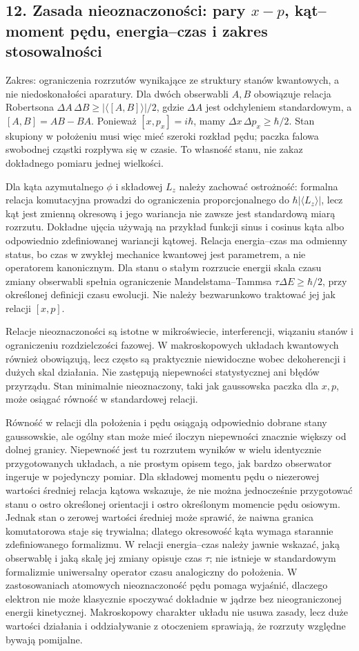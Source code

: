 \documentclass[11pt,a4paper]{article}
\begin{document}
\subsection{12. Zasada nieoznaczoności: pary \(x-p\), kąt--moment pędu, energia--czas i zakres stosowalności}
Zakres: ograniczenia rozrzutów wynikające ze struktury stanów kwantowych, a nie niedoskonałości aparatury. Dla dwóch obserwabli \(A,B\) obowiązuje relacja Robertsona \(\Delta A\,\Delta B\geq|\langle[A,B]\rangle|/2\), gdzie \(\Delta A\) jest odchyleniem standardowym, a \([A,B]=AB-BA\). Ponieważ \([x,p_x]=i\hbar\), mamy \(\Delta x\,\Delta p_x\geq\hbar/2\). Stan skupiony w położeniu musi więc mieć szeroki rozkład pędu; paczka falowa swobodnej cząstki rozpływa się w czasie. To własność stanu, nie zakaz dokładnego pomiaru jednej wielkości.

Dla kąta azymutalnego \(\phi\) i składowej \(L_z\) należy zachować ostrożność: formalna relacja komutacyjna prowadzi do ograniczenia proporcjonalnego do \(\hbar|\langle L_z\rangle|\), lecz kąt jest zmienną okresową i jego wariancja nie zawsze jest standardową miarą rozrzutu. Dokładne ujęcia używają na przykład funkcji sinus i cosinus kąta albo odpowiednio zdefiniowanej wariancji kątowej. Relacja energia--czas ma odmienny status, bo czas w zwykłej mechanice kwantowej jest parametrem, a nie operatorem kanonicznym. Dla stanu o stałym rozrzucie energii skala czasu zmiany obserwabli spełnia ograniczenie Mandelstama--Tammsa \(\tau\Delta E\geq\hbar/2\), przy określonej definicji czasu ewolucji. Nie należy bezwarunkowo traktować jej jak relacji \([x,p]\).

Relacje nieoznaczoności są istotne w mikroświecie, interferencji, wiązaniu stanów i ograniczeniu rozdzielczości fazowej. W makroskopowych układach kwantowych również obowiązują, lecz często są praktycznie niewidoczne wobec dekoherencji i dużych skal działania. Nie zastępują niepewności statystycznej ani błędów przyrządu. Stan minimalnie nieoznaczony, taki jak gaussowska paczka dla \(x,p\), może osiągać równość w standardowej relacji.

Równość w relacji dla położenia i pędu osiągają odpowiednio dobrane stany gaussowskie, ale ogólny stan może mieć iloczyn niepewności znacznie większy od dolnej granicy. Niepewność jest tu rozrzutem wyników w wielu identycznie przygotowanych układach, a nie prostym opisem tego, jak bardzo obserwator ingeruje w pojedynczy pomiar. Dla składowej momentu pędu o niezerowej wartości średniej relacja kątowa wskazuje, że nie można jednocześnie przygotować stanu o ostro określonej orientacji i ostro określonym momencie pędu osiowym. Jednak stan o zerowej wartości średniej może sprawić, że naiwna granica komutatorowa staje się trywialna; dlatego okresowość kąta wymaga starannie zdefiniowanego formalizmu. W relacji energia--czas należy jawnie wskazać, jaką obserwablę i jaką skalę jej zmiany opisuje czas \(\tau\); nie istnieje w standardowym formalizmie uniwersalny operator czasu analogiczny do położenia. W zastosowaniach atomowych nieoznaczoność pędu pomaga wyjaśnić, dlaczego elektron nie może klasycznie spoczywać dokładnie w jądrze bez nieograniczonej energii kinetycznej. Makroskopowy charakter układu nie usuwa zasady, lecz duże wartości działania i oddziaływanie z otoczeniem sprawiają, że rozrzuty względne bywają pomijalne.
\end{document}
